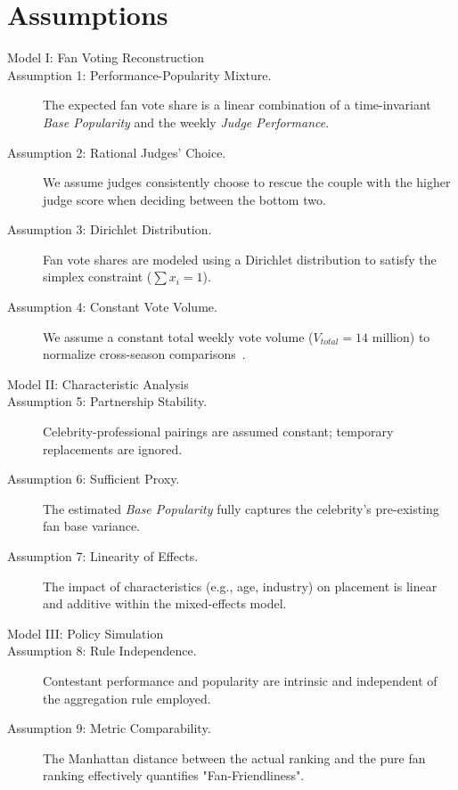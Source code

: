 \section{Assumptions}

\begin{description}

    \item[Model I: Fan Voting Reconstruction]

    \item[Assumption 1: Performance-Popularity Mixture.] The expected fan vote share is a linear combination of a time-invariant \textit{Base Popularity} and the weekly \textit{Judge Performance}.
    \item[Assumption 2: Rational Judges' Choice.] We assume judges consistently choose to rescue the couple with the higher judge score when deciding between the bottom two.
    \item[Assumption 3: Dirichlet Distribution.] Fan vote shares are modeled using a Dirichlet distribution to satisfy the simplex constraint ($\sum x_i = 1$).
    \item[Assumption 4: Constant Vote Volume.] We assume a constant total weekly vote volume ($V_{total} = 14$ million) to normalize cross-season comparisons~\cite{rice2024dwts}.

    \item[Model II: Characteristic Analysis]

    \item[Assumption 5: Partnership Stability.] Celebrity-professional pairings are assumed constant; temporary replacements are ignored.
    \item[Assumption 6: Sufficient Proxy.] The estimated \textit{Base Popularity} fully captures the celebrity's pre-existing fan base variance.
    \item[Assumption 7: Linearity of Effects.] The impact of characteristics (e.g., age, industry) on placement is linear and additive within the mixed-effects model.

    \item[Model III: Policy Simulation]

    \item[Assumption 8: Rule Independence.] Contestant performance and popularity are intrinsic and independent of the aggregation rule employed.
    \item[Assumption 9: Metric Comparability.] The Manhattan distance between the actual ranking and the pure fan ranking effectively quantifies "Fan-Friendliness".


\end{description}
